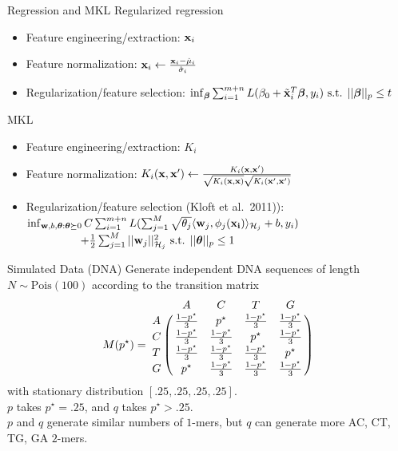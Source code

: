 \documentclass{beamer}
\begin{document}
\begin{frame}{Regression and MKL}
  Regularized regression \pause
  \begin{itemize}
    \item Feature engineering/extraction: ${\bf x}_i$ \pause
    \item Feature normalization: ${\bf x}_i \leftarrow \frac{{\bf x}_i - \hat{\mu}_i}{\hat{\sigma}_i}$ \pause
    \item Regularization/feature selection: $\inf_{{\boldsymbol \beta}} \sum_{i=1}^{m+n} L(\beta_0 + \tilde{{\bf x}}_i^T {\boldsymbol \beta}, y_i) \text{ s.t. } || {\boldsymbol \beta} ||_p \leq t$ \pause
  \end{itemize}
  MKL \pause
  \begin{itemize}
    \item Feature engineering/extraction: $K_i$ \pause
    \item Feature normalization: $K_i({\bf x}, {\bf x}') \leftarrow \frac{K_i({\bf x}, {\bf x}')}{\sqrt{K_i({\bf x}, {\bf x})}\sqrt{K_i({\bf x}', {\bf x}')}}$ \pause
    \item Regularization/feature selection (Kloft et al.\ 2011)): $\inf_{{\bf w}, b, {\boldsymbol \theta} : {\boldsymbol \theta} \succeq 0}
      C \sum_{i=1}^{m+n} L( \sum_{j=1}^M \sqrt{\theta_j} \langle {\bf w}_j, \phi_j({\bf x_i}) \rangle_{\mathcal{H}_j} + b, y_i) $ \\
      $\qquad \qquad \; \; \; + \frac{1}{2} \sum_{j=1}^M || {\bf w}_j ||^2_{\mathcal{H}_j}
      \text{ s.t. } || {\boldsymbol \theta} ||_p \leq 1$
  \end{itemize}
\end{frame}

\begin{frame}{Simulated Data (DNA)}
  Generate independent DNA sequences of length $N \sim \text{Pois}(100)$ according to the transition matrix
  \begin{equation*}
    M(p^{\star}) = \bordermatrix{
      ~ & A & C & T & G \cr
      A & \frac{1-p^{\star}}{3} & p^{\star} & \frac{1-p^{\star}}{3} & \frac{1-p^{\star}}{3} \cr
      C & \frac{1-p^{\star}}{3} & \frac{1-p^{\star}}{3} & p^{\star} & \frac{1-p^{\star}}{3} \cr
      T & \frac{1-p^{\star}}{3} & \frac{1-p^{\star}}{3} & \frac{1-p^{\star}}{3} & p^{\star} \cr
      G & p^{\star} & \frac{1-p^{\star}}{3} & \frac{1-p^{\star}}{3} & \frac{1-p^{\star}}{3} \cr
    }
  \end{equation*}
  with stationary distribution $[.25, .25, .25, .25]$. \\ \pause
  $p$ takes $p^{\star} = .25$, and $q$ takes $p^{\star} > .25$. \\ \pause
  $p$ and $q$ generate similar numbers of $1$-mers, but $q$ can generate more AC, CT, TG, GA $2$-mers.
\end{frame}
\end{document}

